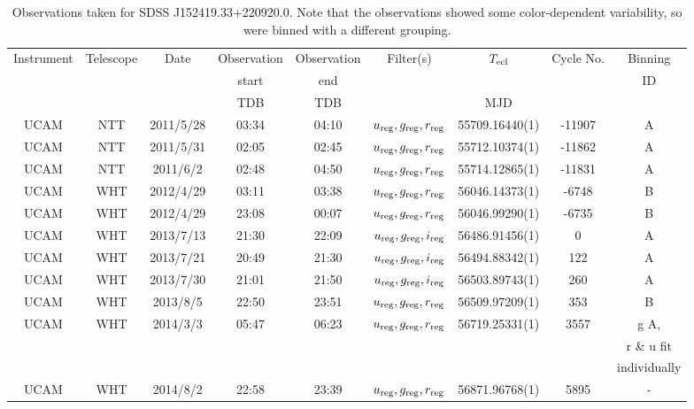 \begin{table}
	\begin{center}
		\caption{Observations taken for SDSS J152419.33+220920.0. Note that the observations showed some color-dependent variability, so were binned with a different grouping.}
		\label{table:observing:observation logs SDSS J152419.33+220920.0}
		\begin{tabular}{ccccccccc}
			\hline
			Instrument & Telescope & Date & Observation  & Observation  & Filter(s) & $T_{\rm ecl}$ & Cycle No. & Binning \\
			 &  &  &  start &  end &  &  &  & ID \\
			 &  &  & TDB & TDB &  & MJD &  &  \\
			\hline
			\hline
			UCAM & NTT & 2011/5/28  & 03:34 & 04:10 & $u_{\rm reg},g_{\rm reg},r_{\rm reg}$ & 55709.16440(1) & -11907 & A \\
			UCAM & NTT & 2011/5/31  & 02:05 & 02:45 & $u_{\rm reg},g_{\rm reg},r_{\rm reg}$ & 55712.10374(1) & -11862 & A \\
			UCAM & NTT & 2011/6/2   & 02:48 & 04:50 & $u_{\rm reg},g_{\rm reg},r_{\rm reg}$ & 55714.12865(1) & -11831 & A \\
			UCAM & WHT & 2012/4/29  & 03:11 & 03:38 & $u_{\rm reg},g_{\rm reg},r_{\rm reg}$ & 56046.14373(1) & -6748  & B \\
			UCAM & WHT & 2012/4/29  & 23:08 & 00:07 & $u_{\rm reg},g_{\rm reg},r_{\rm reg}$ & 56046.99290(1) & -6735  & B \\
			UCAM & WHT & 2013/7/13  & 21:30 & 22:09 & $u_{\rm reg},g_{\rm reg},i_{\rm reg}$ & 56486.91456(1) & 0      & A \\
			UCAM & WHT & 2013/7/21  & 20:49 & 21:30 & $u_{\rm reg},g_{\rm reg},i_{\rm reg}$ & 56494.88342(1) & 122    & A \\
			UCAM & WHT & 2013/7/30  & 21:01 & 21:50 & $u_{\rm reg},g_{\rm reg},i_{\rm reg}$ & 56503.89743(1) & 260    & A \\
			UCAM & WHT & 2013/8/5   & 22:50 & 23:51 & $u_{\rm reg},g_{\rm reg},r_{\rm reg}$ & 56509.97209(1) & 353    & B \\
			UCAM & WHT & 2014/3/3   & 05:47 & 06:23 & $u_{\rm reg},g_{\rm reg},r_{\rm reg}$ & 56719.25331(1) & 3557   & g A, \\
			     &     &            &       &       &                                       &                &        & r \& u fit \\
				 &     &            &       &       &                                       &                &        & individually \\
			UCAM & WHT & 2014/8/2   & 22:58 & 23:39 & $u_{\rm reg},g_{\rm reg},r_{\rm reg}$ & 56871.96768(1) & 5895   & - \\
		   \hline
		\end{tabular}
	\end{center}
\end{table}